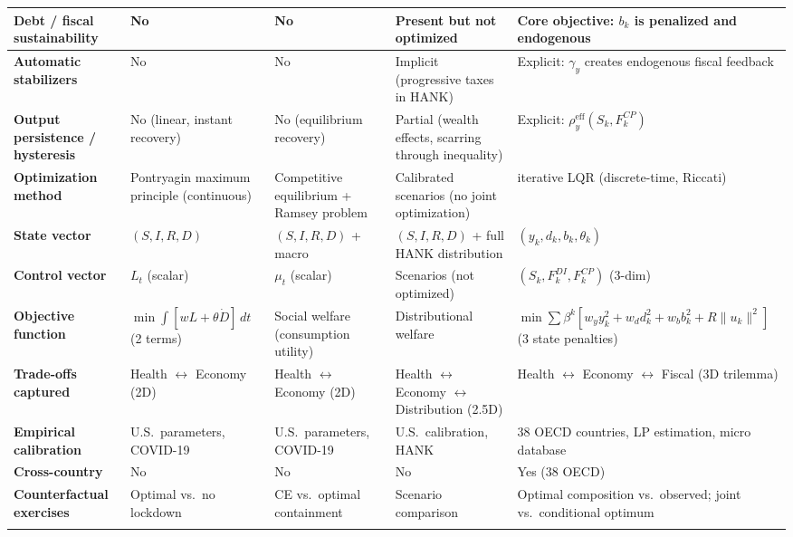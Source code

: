 \documentclass[12pt, a4paper]{article}
\begin{document}
\begin{small}
\begin{longtable}{P{3.2cm}P{3cm}P{3cm}P{3cm}P{3cm}}
\textbf{Debt / fiscal sustainability} & \textbf{No} & \textbf{No} & Present but not optimized & \textbf{Core objective:} $b_k$ is penalized and endogenous \\
\midrule

\textbf{Automatic stabilizers} & No & No & Implicit (progressive taxes in HANK) & Explicit: $\gamma_y$ creates endogenous fiscal feedback \\
\midrule

\textbf{Output persistence / hysteresis} & No (linear, instant recovery) & No (equilibrium recovery) & Partial (wealth effects, scarring through inequality) & Explicit: $\rho_y^{\text{eff}}(S_k, F_k^{CP})$ \\
\midrule

\textbf{Optimization method} & Pontryagin maximum principle (continuous) & Competitive equilibrium + Ramsey problem & Calibrated scenarios (no joint optimization) & iterative LQR (discrete-time, Riccati) \\
\midrule

\textbf{State vector} & $(S, I, R, D)$ & $(S, I, R, D)$ + macro & $(S, I, R, D)$ + full HANK distribution & $(y_k, d_k, b_k, \theta_k)$ \\
\midrule

\textbf{Control vector} & $L_t$ (scalar) & $\mu_t$ (scalar) & Scenarios (not optimized) & $(S_k, F_k^{DI}, F_k^{CP})$ (3-dim) \\
\midrule

\textbf{Objective function} & $\min \int [w L + \theta \dot{D}]\,dt$ (2 terms) & Social welfare (consumption utility) & Distributional welfare & $\min \sum \beta^k [w_y y_k^2 + w_d d_k^2 + w_b b_k^2 + R \|u_k\|^2]$ (3 state penalties) \\
\midrule

\textbf{Trade-offs captured} & Health $\leftrightarrow$ Economy (2D) & Health $\leftrightarrow$ Economy (2D) & Health $\leftrightarrow$ Economy $\leftrightarrow$ Distribution (2.5D) & Health $\leftrightarrow$ Economy $\leftrightarrow$ Fiscal (3D trilemma) \\
\midrule

\textbf{Empirical calibration} & U.S.\ parameters, COVID-19 & U.S.\ parameters, COVID-19 & U.S.\ calibration, HANK & 38 OECD countries, LP estimation, micro database \\
\midrule

\textbf{Cross-country} & No & No & No & Yes (38 OECD) \\
\midrule

\textbf{Counterfactual exercises} & Optimal vs.\ no lockdown & CE vs.\ optimal containment & Scenario comparison & Optimal composition vs.\ observed; joint vs.\ conditional optimum \\
\bottomrule
\label{tab:structured_comp}
\end{longtable}
\end{small}
\end{document}
